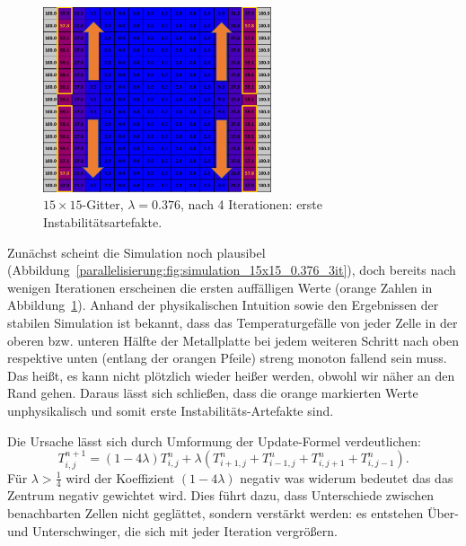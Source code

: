\begin{figure}[htbp]
	\centering
	\includegraphics[width=0.6\textwidth]{papers/parallelisierung/images/simulation_15x15_0.376_4it.pdf}
	\caption{\(15\times 15\)-Gitter, \(\lambda = 0.376\), nach 4 Iterationen: erste Instabilitätsartefakte.}
	\label{parallelisierung:fig:simulation_15x15_0.376_4it}
\end{figure}

Zunächst scheint die Simulation noch plausibel (Abbildung~\ref{parallelisierung:fig:simulation_15x15_0.376_3it}), doch bereits nach wenigen Iterationen erscheinen die ersten auffälligen Werte (orange Zahlen in Abbildung~\ref{parallelisierung:fig:simulation_15x15_0.376_4it}). Anhand der physikalischen Intuition sowie den Ergebnissen der stabilen Simulation ist bekannt, dass das Temperaturgefälle von jeder Zelle in der oberen bzw. unteren Hälfte der Metallplatte bei jedem weiteren Schritt nach oben respektive unten (entlang der orangen Pfeile) streng monoton fallend sein muss. Das heißt, es kann nicht plötzlich wieder heißer werden, obwohl wir näher an den Rand gehen. Daraus lässt sich schließen, dass die orange markierten Werte unphysikalisch und somit erste Instabilitäts-Artefakte sind.


Die Ursache lässt sich durch Umformung der Update-Formel verdeutlichen:
\begin{equation}
	T_{i,j}^{n+1}
	=
	(1-4\lambda)T_{i,j}^n +
	\lambda \left(
	T_{i+1,j}^n + T_{i-1,j}^n + T_{i,j+1}^n + T_{i,j-1}^n
	\right).
\end{equation}
Für \(\lambda > \tfrac14\) wird der Koeffizient \((1-4\lambda)\) negativ was widerum bedeutet das das Zentrum negativ gewichtet wird.  
Dies führt dazu, dass Unterschiede zwischen benachbarten Zellen nicht geglättet, sondern verstärkt werden: es entstehen Über- und Unterschwinger, die sich mit jeder Iteration vergrößern.

